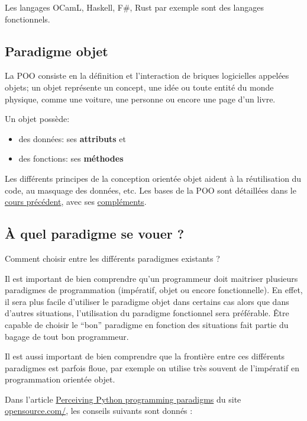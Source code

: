 \documentclass[
  a4paper,
  DIV=11,
  numbers=noendperiod]{scrartcl}
\providecommand{\tightlist}{%
  \setlength{\itemsep}{0pt}\setlength{\parskip}{0pt}}\usepackage{longtable,booktabs,array}
\begin{document}
Les langages OCamL, Haskell, F\#, Rust par exemple sont des langages
fonctionnels.

\hypertarget{paradigme-objet}{%
\subsection{Paradigme objet}\label{paradigme-objet}}

La POO consiste en la définition et l'interaction de briques logicielles
appelées objets; un objet représente un concept, une idée ou toute
entité du monde physique, comme une voiture, une personne ou encore une
page d'un livre.

Un objet possède:

\begin{itemize}
\tightlist
\item
  des données: ses \textbf{attributs} et
\item
  des fonctions: ses \textbf{méthodes}
\end{itemize}

Les différents principes de la conception orientée objet aident à la
réutilisation du code, au masquage des données, etc. Les bases de la POO
sont détaillées dans le \href{POO_cours.qmd}{cours précédent}, avec ses
\href{POO_complements.qmd}{compléments}.

\hypertarget{uxe0-quel-paradigme-se-vouer}{%
\subsection{À quel paradigme se vouer
?}\label{uxe0-quel-paradigme-se-vouer}}

Comment choisir entre les différents paradigmes existants ?

Il est important de bien comprendre qu'un programmeur doit maitriser
plusieurs paradigmes de programmation (impératif, objet ou encore
fonctionnelle). En effet, il sera plus facile d'utiliser le paradigme
objet dans certains cas alors que dans d'autres situations,
l'utilisation du paradigme fonctionnel sera préférable. Être capable de
choisir le ``bon'' paradigme en fonction des situations fait partie du
bagage de tout bon programmeur.

Il est aussi important de bien comprendre que la frontière entre ces
différents paradigmes est parfois floue, par exemple on utilise très
souvent de l'impératif en programmation orientée objet.

Dans l'article
\href{https://opensource.com/article/19/10/python-programming-paradigms}{Perceiving
Python programming paradigms} du site
\href{https://opensource.com/}{opensource.com/}, les conseils suivants
sont donnés :
\end{document}
